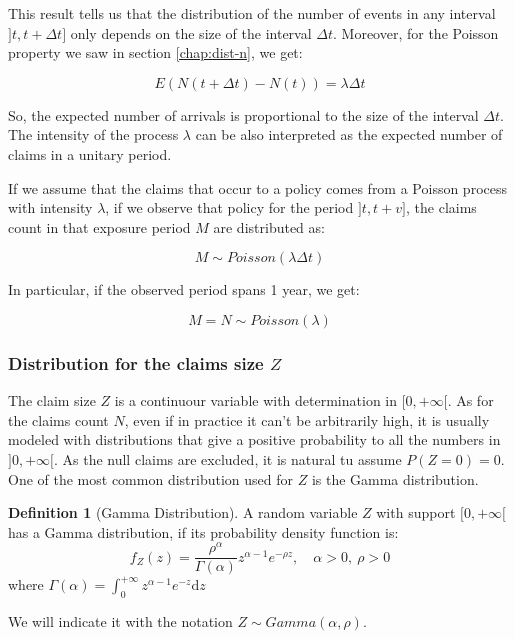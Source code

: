 \documentclass[a4paper, nobind]{templates/ociamthesis}
\theoremstyle{definition}
\newtheorem{definition}{Definition}[chapter]
\theoremstyle{definition}
\theoremstyle{definition}
\theoremstyle{remark}
\begin{document}
This result tells us that the distribution of the number of events in any interval \(]t, t+\Delta t]\) only depends on the size of the interval \(\Delta t\). Moreover, for the Poisson property we saw in section \ref{chap:dist-n}, we get:

\[E(N(t + \Delta t) - N(t)) = \lambda \Delta t\]

So, the expected number of arrivals is proportional to the size of the interval \(\Delta t\). The intensity of the process \(\lambda\) can be also interpreted as the expected number of claims in a unitary period.

If we assume that the claims that occur to a policy comes from a Poisson process with intensity \(\lambda\), if we observe that policy for the period \(]t, t+v]\), the claims count in that exposure period \(M\) are distributed as:

\[ M\sim Poisson(\lambda \Delta t) \]

In particular, if the observed period spans 1 year, we get:

\[ M = N \sim Poisson(\lambda) \]

\hypertarget{distribution-for-the-claims-size-z}{%
\subsubsection{\texorpdfstring{Distribution for the claims size \(Z\)}{Distribution for the claims size Z}}\label{distribution-for-the-claims-size-z}}

The claim size \(Z\) is a continuour variable with determination in \([0, +\infty[\). As for the claims count \(N\), even if in practice it can't be arbitrarily high, it is usually modeled with distributions that give a positive probability to all the numbers in \(]0, +\infty[\). As the null claims are excluded, it is natural tu assume \(P\left( Z=0 \right) = 0\). One of the most common distribution used for \(Z\) is the Gamma distribution.

\begin{definition}[Gamma Distribution]
\label{def:def-gamma} \iffalse (Gamma Distribution) \fi{} A random variable \(Z\) with support \([0, +\infty[\) has a Gamma distribution, if its probability density function is:
\[
f_Z(z) = \frac{\rho^\alpha}{\Gamma(\alpha)}z^{\alpha-1}e^{-\rho z}, \quad \alpha > 0, \ \rho > 0
\]
where \(\Gamma(\alpha) = \int_{0}^{+\infty}{z^{\alpha - 1} e^{-z} \mathrm{d} z}\)

We will indicate it with the notation \(Z \sim Gamma(\alpha, \rho)\).
\end{definition}
\end{document}
